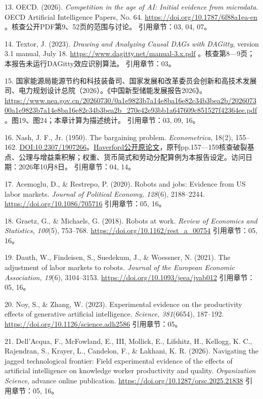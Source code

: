 \documentclass[UTF8,fontset=windows,12pt,a4paper,oneside,openany]{ctexbook}
\begin{document}
13. OECD. (2026). \emph{Competition in the age of AI: Initial evidence from microdata}. OECD Artificial Intelligence Papers, No. 64. \url{https://doi.org/10.1787/6f88a1ea-en} 。核查公开PDF第9、52页的范围与讨论。
引用章节：03, 04, 07。

14. Textor, J. (2023). \emph{Drawing and Analyzing Causal DAGs with DAGitty}, version 3.1 manual, July 18. \url{https://www.dagitty.net/manual-3.x.pdf} 。核查第8—9页；本报告未运行DAGitty效应识别算法。
引用章节：03。

15. 国家能源局能源节约和科技装备司、国家发展和改革委员会创新和高技术发展司、电力规划设计总院（2026）。《中国新型储能发展报告2026》。\url{https://www.nea.gov.cn/20260730/0a1e9823b7a14e8ba16e82c34b3bea2b/202607300a1e9823b7a14e8ba16e82c34b3bea2b_270e42e93bb1a647609c851527f42364ee.pdf} 。图19、图24；本章计算为描述统计。
引用章节：03, 09, 16。

16. Nash, J. F., Jr. (1950). The bargaining problem. \emph{Econometrica}, 18(2), 155–162. \href{https://doi.org/10.2307/1907266}{DOI:10.2307/1907266}。\href{https://www.haverford.edu/sites/default/files/Nash1950.pdf}{Haverford公开原论文}，原刊pp.157—159核查破裂基点、公理与增益乘积解；权重、货币简式和劳动分配算例为本报告设定。访问日期：2026年10月8日。
引用章节：04, 14。

17. Acemoglu, D., \& Restrepo, P. (2020). Robots and jobs: Evidence from US labor markets. \emph{Journal of Political Economy, 128}(6), 2188–2244. \url{https://doi.org/10.1086/705716}
引用章节：05, 16。

18. Graetz, G., \& Michaels, G. (2018). Robots at work. \emph{Review of Economics and Statistics, 100}(5), 753–768. \url{https://doi.org/10.1162/rest_a_00754}
引用章节：05, 16。

19. Dauth, W., Findeisen, S., Suedekum, J., \& Woessner, N. (2021). The adjustment of labor markets to robots. \emph{Journal of the European Economic Association, 19}(6), 3104–3153. \url{https://doi.org/10.1093/jeea/jvab012}
引用章节：05, 16。

20. Noy, S., \& Zhang, W. (2023). Experimental evidence on the productivity effects of generative artificial intelligence. \emph{Science, 381}(6654), 187–192. \url{https://doi.org/10.1126/science.adh2586}
引用章节：05。

21. Dell’Acqua, F., McFowland, E., III, Mollick, E., Lifshitz, H., Kellogg, K. C., Rajendran, S., Krayer, L., Candelon, F., \& Lakhani, K. R. (2026). Navigating the jagged technological frontier: Field experimental evidence of the effects of artificial intelligence on knowledge worker productivity and quality. \emph{Organization Science}, advance online publication. \url{https://doi.org/10.1287/orsc.2025.21838}
引用章节：05, 16。
\end{document}
